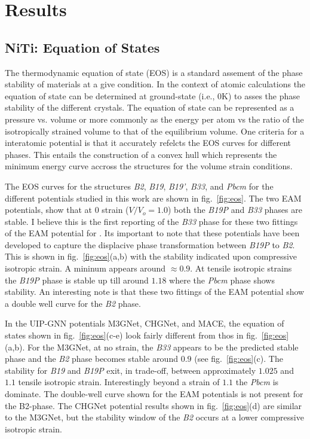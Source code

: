 \documentclass[preprint]{elsarticle}
\begin{document}
\section{Results}
\label{sec:results}


\subsection{NiTi: Equation of States}
\label{subsec:nitieos}

The thermodynamic equation of state (EOS) is a standard assement of the phase stability of materials at a give condition. In the context of atomic calculations the equation of state can be determined at ground-state (i.e., 0K) to asses the phase stability of the different crystals. The equation of state can be represented as a pressure vs. volume or more commonly as the energy per atom  vs the ratio of the isotropically strained volume to that of the equilibrium volume. One criteria for a interatomic potential is that it accurately refelcts the EOS curves for different phases. This entails the construction of a convex hull which represents the minimum energy curve accross the structures for the volume strain conditions. \par

The EOS curves for the  structures \textit{B2}, \textit{B19}, \textit{B19'}, \textit{B33}, and \textit{Pbcm}  for the different potentials studied in this work are shown in fig.~\ref{fig:eos}. The two EAM potentials, show that at 0 strain ($V/V_o = 1.0$) both the \textit{B19P} and \textit{B33} phases are stable. I believe this is the first reporting of the \textit{B33} phase for these two fittings of the EAM potential for . Its important to note that these potentials have been developed to capture the displacive phase transformation between \textit{B19P} to \textit{B2}. This is shown in fig.~\ref{fig:eos}(a,b) with the stability indicated upon compressive isotropic strain. A mininum appears around $\approx 0.9$. At tensile isotropic strains the \textit{B19P} phase is stable up till around $1.18$ where the \textit{Pbcm} phase shows stability. An interesting note is that these two fittings of the EAM potential show a double well curve for the \textit{B2} phase. \par

In the UIP-GNN potentials M3GNet, CHGNet, and MACE, the equation of states shown in fig.~\ref{fig:eos}(c-e) look fairly different from thos in fig.~\ref{fig:eos}(a,b). For the M3GNet,  at no strain, the \textit{B33} appears to be the predicted stable phase and the \textit{B2} phase becomes stable around $0.9$ (see fig.~\ref{fig:eos}(c). The stability for \textit{B19} and \textit{B19P} exit, in trade-off, between approximately $1.025$ and $1.1$ tensile isotropic strain. Interestingly beyond a strain of $1.1$ the \textit{Pbcm} is dominate. The double-well curve shown for the EAM potentials is not present for the B2-phase. The CHGNet potential results shown in fig.~\ref{fig:eos}(d) are similar to the M3GNet, but the stability window of the \textit{B2} occurs at a lower compressive isotropic strain. \par
\end{document}
